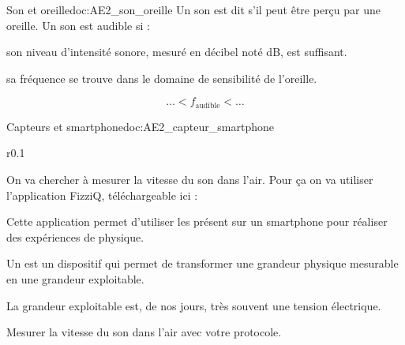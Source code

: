 \begin{doc}{Son et oreille}{doc:AE2_son_oreille}
  Un son est dit  s'il peut être perçu par une oreille.
  Un son est audible si :
  \begin{listePoints}
    \item son niveau d'intensité sonore, mesuré en décibel noté dB, est suffisant.
    \item sa fréquence se trouve dans le domaine de sensibilité de l'oreille.
  \end{listePoints}
  \begin{equation*}
      \ldots < f_\text{audible} < \ldots
  \end{equation*}
\end{doc}



\begin{doc}{Capteurs et smartphone}{doc:AE2_capteur_smartphone}
  \begin{wrapfigure}[5]{r}{0.1\linewidth}
    \vspace*{-28pt}
  \end{wrapfigure}
  On va chercher à mesurer la vitesse du son dans l'air.
  Pour ça on va utiliser l'application FizziQ, téléchargeable ici :
  
  Cette application permet d'utiliser les  présent sur un smartphone pour réaliser des expériences de physique.
  
  \begin{encart}
    Un  est un dispositif qui permet de transformer une grandeur physique mesurable en une grandeur exploitable.
  \end{encart}
  La grandeur exploitable est, de nos jours, très souvent une tension électrique.
\end{doc}




\mesure Mesurer la vitesse du son dans l'air avec votre protocole.